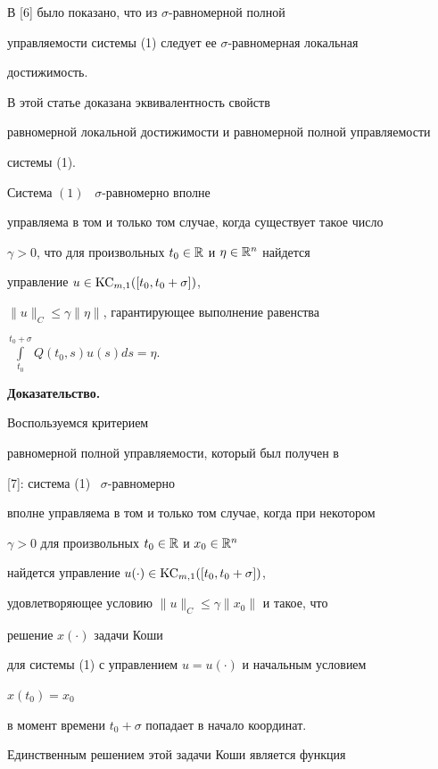 В [6] было показано, что из $\sigma$-равномерной полной


управляемости системы (1) следует ее $\sigma$-равномерная локальная


достижимость.


В этой статье доказана эквивалентность свойств


равномерной локальной достижимости и равномерной полной управляемости


системы (1).





\begin{lem}


Система $(1)$ \ $\sigma$-равномерно вполне


управляема в том и только том случае, когда существует такое число


$\gamma>0$, что для произвольных $t_0\in\Bbb R$ и $\eta\in\Bbb R^n$ найдется


управление $u\in\mathrm{KC}_{m,1}([t_0,t_0+\sigma])$,


$\|u\|_C\le\gamma\|\eta\|$, гарантирующее выполнение равенства


$\int\limits_{t_0}^{t_0+\sigma}Q(t_0,s)u(s)ds{=}\eta$.


\end{lem}





{\bf Доказательство.}


Воспользуемся критерием


равномерной полной управляемости, который был получен в


[7]: система (1) \ $\sigma$-равномерно


вполне управляема в том и только том случае, когда при некотором


$\gamma>0$ для произвольных $t_0\in\Bbb R$ и $x_0\in\Bbb R^n$


найдется управление $u(\cdot)\in\mathrm{KC}_{m,1}([t_0,t_0+\sigma])$,


удовлетворяющее условию $\|u\|_C\le\gamma\|x_0\|$ и такое, что


решение $x(\cdot)$ задачи Коши


для системы (1) с управлением $u=u(\cdot)$ и начальным условием


$x(t_0)=x_0$


в момент времени $t_0+\sigma$ попадает в начало координат.


Единственным решением этой задачи Коши является функция



